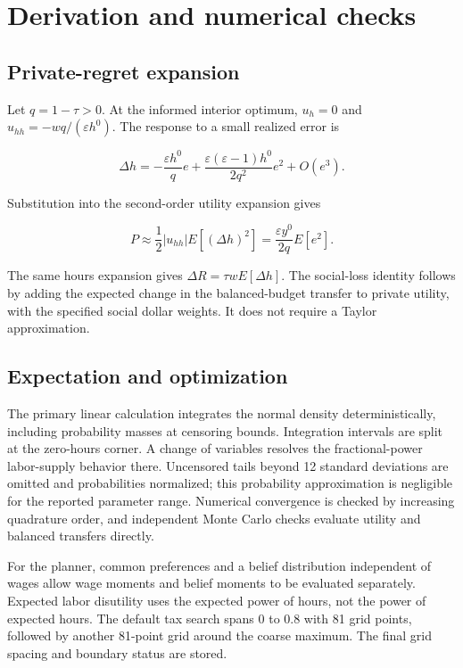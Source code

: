 \documentclass[
  11pt,
  letterpaper,
  DIV=11,
  numbers=noendperiod]{scrartcl}
\begin{document}
\section{Derivation and numerical
checks}\label{derivation-and-numerical-checks}

\subsection{Private-regret expansion}\label{private-regret-expansion}

Let \(q=1-\tau>0\). At the informed interior optimum, \(u_h=0\) and
\(u_{hh}=-wq/(\varepsilon h^0)\). The response to a small realized error
is

\[\Delta h=-\frac{\varepsilon h^0}{q}e+\frac{\varepsilon(\varepsilon-1)h^0}{2q^2}e^2+O(e^3).\]

Substitution into the second-order utility expansion gives

\[P\approx\frac{1}{2}|u_{hh}|E[(\Delta h)^2]=\frac{\varepsilon y^0}{2q}E[e^2].\]

The same hours expansion gives \(\Delta R=\tau wE[\Delta h]\). The
social-loss identity follows by adding the expected change in the
balanced-budget transfer to private utility, with the specified social
dollar weights. It does not require a Taylor approximation.

\subsection{Expectation and
optimization}\label{expectation-and-optimization}

The primary linear calculation integrates the normal density
deterministically, including probability masses at censoring bounds.
Integration intervals are split at the zero-hours corner. A change of
variables resolves the fractional-power labor-supply behavior there.
Uncensored tails beyond 12 standard deviations are omitted and
probabilities normalized; this probability approximation is negligible
for the reported parameter range. Numerical convergence is checked by
increasing quadrature order, and independent Monte Carlo checks evaluate
utility and balanced transfers directly.

For the planner, common preferences and a belief distribution
independent of wages allow wage moments and belief moments to be
evaluated separately. Expected labor disutility uses the expected power
of hours, not the power of expected hours. The default tax search spans
0 to 0.8 with 81 grid points, followed by another 81-point grid around
the coarse maximum. The final grid spacing and boundary status are
stored.
\end{document}
